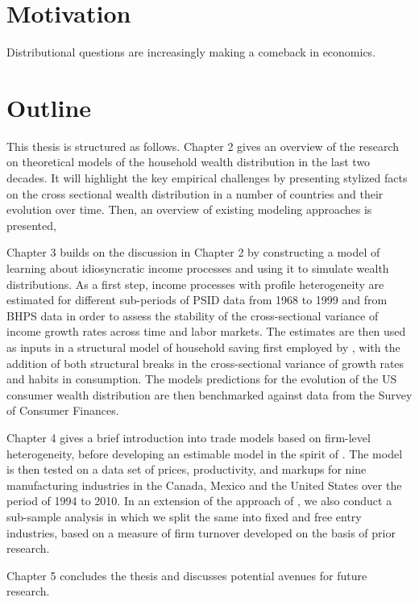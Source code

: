 \section{Motivation}
Distributional questions are increasingly making a comeback in economics. 


\section{Outline}
This thesis is structured as follows. Chapter 2 gives an overview of the research on theoretical models of the household wealth distribution in the last two decades. It will highlight the key empirical challenges by presenting stylized facts on the cross sectional wealth distribution in a number of countries and their evolution over time. Then, an overview of existing modeling approaches is presented,  

Chapter 3 builds on the discussion in Chapter 2 by constructing a model of learning about idiosyncratic income processes and using it to simulate wealth distributions. As a first step, income processes with profile heterogeneity are estimated for different sub-periods of PSID data from 1968 to 1999 and from BHPS data in order to assess the stability of the cross-sectional variance of income growth rates across time and labor markets. The estimates are then used as inputs in a structural model of household saving first employed by \citet{Guvenen2007}, with the addition of both structural breaks in the cross-sectional variance of growth rates and habits in consumption. The models predictions for the evolution of the US consumer wealth distribution are then benchmarked against data from the Survey of Consumer Finances. 

Chapter 4 gives a brief introduction into trade models based on firm-level heterogeneity, before developing an estimable model in the spirit of \citet{Chen2009}. The model is then tested on a data set of prices, productivity, and markups for nine manufacturing industries in the Canada, Mexico and the United States over the period of 1994 to 2010. In an extension of the approach of \citet{Chen2009}, we also conduct a sub-sample analysis in which we split the same into fixed and free entry industries, based on a measure of firm turnover developed on the basis of prior research. 

Chapter 5 concludes the thesis and discusses potential avenues for future research.